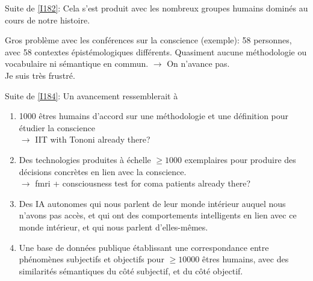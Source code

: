 \documentclass[11pt,a4paper]{article}
\begin{document}
\begin{I}
Suite de \ref{I182}: Cela s'est produit avec les nombreux groupes humains dominés au cours de notre histoire.
\end{I}

\begin{I}
Gros problème avec les conférences sur la conscience (exemple): 58 personnes, avec 58 contextes épistémologiques différents. Quasiment aucune méthodologie ou vocabulaire ni sémantique en commun. $\rightarrow$ On n'avance pas.\\
Je suis très frustré.
\end{I}

\begin{I}
Suite de \ref{I184}: Un avancement ressemblerait à
\begin{enumerate}[label=\Alph*]
\item 1000 êtres humains d'accord sur une méthodologie et une définition pour étudier la conscience\\ $\rightarrow$ IIT with Tononi already there?
\item Des technologies produites à échelle $\geq 1000$ exemplaires pour produire des 
décisions concrètes en lien avec la conscience.\\
$\rightarrow$ fmri + consciousness test for coma patients already there?
\item Des IA autonomes qui nous parlent de leur monde intérieur auquel nous n'avons pas accès, et qui ont des comportements intelligents en lien avec ce monde intérieur, et qui nous parlent d'elles-mêmes.
\item Une base de données publique établissant une correspondance entre phénomènes subjectifs et objectifs pour $\geq 10000$ êtres humains, avec des similarités sémantiques du côté subjectif, et du côté objectif. 
\end{enumerate}
\end{I}
\end{document}
